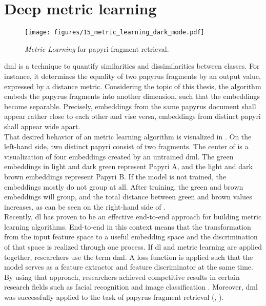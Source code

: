 \section{Deep metric learning}
\label{sec:dml}
\begin{figure}[t]
	\centering
	\texttt{[image: figures/15\_metric\_learning\_dark\_mode.pdf]}
	\caption{\textit{Metric Learning} for papyri fragment retrieval.}
	\label{fig:FigureML}
\end{figure} 
%
\ac{dml} is a technique to quantify similarities and dissimilarities between classes. For instance, it determines the equality of two papyrus fragments by an output value, expressed by a distance metric. Considering the topic of this thesis, the algorithm embeds the papyrus fragments into another dimension, such that the embeddings become separable. Precisely, embeddings from the same papyrus document shall appear rather close to each other and vise versa, embeddings from distinct papyri shall appear wide apart.\\

\noindent That desired behavior of an metric learning algorithm is visualized in . On the left-hand side, two distinct papyri consist of two fragments. The center of  is a visualization of four embeddings created by an untrained \ac{dml}. The green embeddings in light and dark green represent Papyri A, and the light and dark brown embeddings represent Papyri B. If the model is not trained, the embeddings mostly do not group at all. After training, the green and brown embeddings will group, and the total distance between green and brown values increases, as can be seen on the right-hand side of . \\

\noindent Recently, \ac{dl} has proven to be an effective end-to-end approach for building metric learning algorithms. End-to-end in this context means that the transformation from the input feature space to a useful embedding space and the discrimination of that space is realized through one process. If \ac{dl} and metric learning are applied together, researchers use the term \ac{dml}. A loss function is applied such that the model serves as a feature extractor and feature discriminator at the same time. By using that approach, researchers achieved competitive results in certain research fields such as facial recognition and image classification \cite{Duan18, Dai18, Kim_2018_ECCV}. Moreover, \ac{dml} was successfully applied to the task of papyrus fragment retrieval (, ).\\

